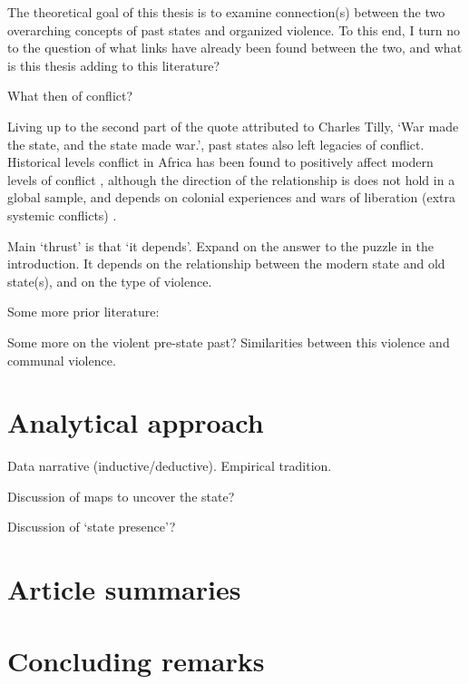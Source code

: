 \documentclass[12pt]{article}
\begin{document}
The theoretical goal of this thesis is to examine connection(s) between the two
overarching concepts of past states and organized violence. To this end, I turn
no to the question of what links have already been found between the two, and
what is this thesis adding to this literature? 


What then of conflict?

Living up to the second part of the quote attributed to Charles Tilly, `War
made the state, and the state made war.', past states also left legacies of
conflict. Historical levels conflict in Africa has been found to positively
affect modern levels of conflict \citep{Besley2014}, although the direction of
the relationship is does not hold in a global sample, and depends on colonial
experiences and wars of liberation (extra systemic conflicts)
\citep{Fearon2014}. 

\citet{Dincecco_2019}


Main `thrust' is that `it depends'. Expand on the answer to the puzzle in the
introduction. It depends on the relationship between the modern state and old
state(s), and on the type of violence.

Some more prior literature: \citet{Griffiths2016} \citet{Ahram2019}

Some more on the violent pre-state past? Similarities between this violence and
communal violence.

\section{Analytical approach} \label{Analytical approach}

Data narrative (inductive/deductive). Empirical tradition.

Discussion of maps to uncover the state?

Discussion of `state presence'?

\section{Article summaries} \label{Article summaries}

\section{Concluding remarks} \label{Concluding remarks}

\pagebreak



\end{document}
